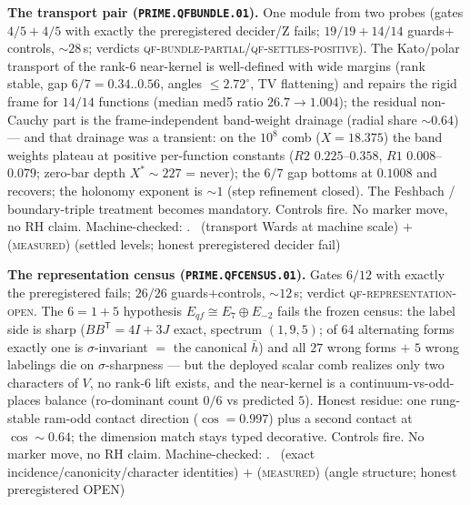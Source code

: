 \documentclass[11pt,a4paper]{article}
\theoremstyle{definition}
\begin{document}
\par\smallskip\noindent\textbf{The transport pair
(\texttt{PRIME.QFBUNDLE.01}).}
One module from two probes (gates $4/5+4/5$ with exactly the
preregistered decider/Z fails; $19/19+14/14$ guards$+$controls,
${\sim}28$\,s; verdicts
\textsc{qf-bundle-partial}/\textsc{qf-settles-positive}).  The
Kato/polar transport of the rank-6 near-kernel is well-defined
with wide margins (rank stable, gap $6/7 = 0.34$..$0.56$, angles
$\le2.72^{\circ}$, TV flattening) and repairs the rigid frame for
$14/14$ functions (median med5 ratio $26.7\to1.004$); the residual
non-Cauchy part is the frame-independent band-weight drainage
(radial share ${\sim}0.64$) --- and that drainage was a transient:
on the $10^{8}$ comb ($X=18.375$) the band weights plateau at
positive per-function constants ($R2$ $0.225$--$0.358$, $R1$
$0.008$--$0.079$; zero-bar depth $X^{*}\sim227$ = never); the
$6/7$ gap bottoms at $0.1008$ and recovers; the holonomy exponent
is ${\sim}1$ (step refinement closed).  The Feshbach /
boundary-triple treatment becomes mandatory.  Controls fire.
No marker move, no RH claim.
Machine-checked: .
\mE\ (transport Wards at machine scale) $+$ (\textsc{measured})
(settled levels; honest preregistered decider fail)
\par\smallskip

\par\smallskip\noindent\textbf{The representation census
(\texttt{PRIME.QFCENSUS.01}).}
Gates $6/12$ with exactly the preregistered fails; $26/26$
guards$+$controls, ${\sim}12$\,s; verdict
\textsc{qf-representation-open}.  The $6=1{+}5$ hypothesis
$E_{qf}\cong E_{7}\oplus E_{-2}$ fails the frozen census: the
label side is sharp ($BB^{\mathsf T}=4I+3J$ exact, spectrum
$(1,9,5)$; of $64$ alternating forms exactly one is
$\sigma$-invariant $=$ the canonical $\bar h$) and all $27$ wrong
forms $+$ $5$ wrong labelings die on $\sigma$-sharpness --- but
the deployed scalar comb realizes only two characters of $V$, no
rank-6 lift exists, and the near-kernel is a
continuum-vs-odd-places balance (ro-dominant count $0/6$ vs
predicted $5$).  Honest residue: one rung-stable ram-odd contact
direction ($\cos=0.997$) plus a second contact at $\cos\sim0.64$;
the dimension match stays typed decorative.  Controls fire.
No marker move, no RH claim.
Machine-checked: .
\mE\ (exact incidence/canonicity/character identities) $+$
(\textsc{measured}) (angle structure; honest preregistered OPEN)
\par\smallskip
\end{document}
